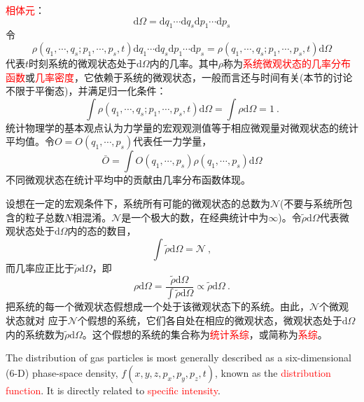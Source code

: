 \documentclass[12pt,a4paper]{article}
\newcommand{\dif}{\mathrm{d}}
\newcommand\ddfrac[2]{\frac{\displaystyle #1}{\displaystyle #2}}
\begin{document}
\textcolor{red}{相体元}：
\begin{equation}
\dif \Omega = \dif q_1 \cdots \dif q_s \dif p_1 \cdots \dif p_s
\end{equation}
令
\begin{equation}
\rho(q_1, \cdots, q_s; p_1, \cdots, p_s, t) \dif q_1 \cdots \dif q_s \dif p_1 \cdots \dif p_s = \rho(q_1, \cdots, q_s; p_1, \cdots, p_s, t) \dif \Omega
\end{equation}
代表$t$时刻系统的微观状态处于$\dif \Omega$内的几率。其中$\rho$称为\textcolor{red}{系统微观状态的几率分布函数}或\textcolor{red}{几率密度}，它依赖于系统的微观状态，一般而言还与时间有关(本节的讨论不限于平衡态)，并满足归一化条件：
\begin{equation}
\int \rho(q_1, \cdots, q_s; p_1, \cdots, p_s, t) \dif \Omega = \int \rho \dif \Omega = 1 ~.
\end{equation}
统计物理学的基本观点认为力学量的宏观观测值等于相应微观量对微观状态的统计平均值。令$O = O(q_1, \cdots, p_s)$代表任一力学量，
\begin{equation}
\bar{O} = \int O(q_1, \cdots, p_s) \rho(q_1, \cdots, p_s) \dif \Omega
\end{equation}
不同微观状态在统计平均中的贡献由几率分布函数体现。

设想在一定的宏观条件下，系统所有可能的微观状态的总数为$\mathcal N$(不要与系统所包含的粒子总数$N$相混淆。$\mathcal N$是一个极大的数，在经典统计中为$\infty$)。令$\tilde{\rho} \dif \Omega$代表微观状态处于$\dif \Omega$内的态的数目，
\begin{equation*}
\int \tilde{\rho} \dif \Omega = \mathcal N ~,
\end{equation*}
而几率应正比于$\tilde{\rho} \dif \Omega$，即
\begin{equation}
\rho \dif \Omega = \ddfrac{\tilde{\rho} \dif \Omega}{\int \tilde{\rho} \dif \Omega} \propto \tilde{\rho} \dif \Omega ~.
\end{equation}
把系统的每一个微观状态假想成一个处于该微观状态下的系统。由此，$\mathcal N$个微观状态就对 应于$\mathcal N$个假想的系统，它们各自处在相应的微观状态，微观状态处于$\dif \Omega$内的系统数为$\tilde{\rho} \dif \Omega$。这个假想的系统的集合称为\textcolor{red}{统计系综}，或简称为\textcolor{red}{系综}。

\cite{2008aspr.book.....B} The distribution of gas particles is most generally described as a six-dimensional ($6$-D) phase-space density, $f(x,y,z,p_x, p_y, p_z,t)$, known as the \textcolor{red}{distribution function}. It is directly related to \textcolor{red}{specific intensity}. 
\end{document}
